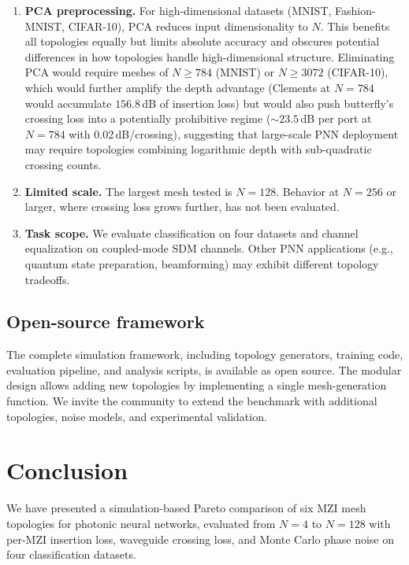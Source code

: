 \documentclass[11pt,a4paper]{article}
\begin{document}
\begin{enumerate}
  \item \textbf{PCA preprocessing.}  For high-dimensional datasets (MNIST,
        Fashion-MNIST, CIFAR-10), PCA reduces input dimensionality to $N$.
        This benefits all topologies equally but limits absolute accuracy and
        obscures potential differences in how topologies handle
        high-dimensional structure.  Eliminating PCA would require meshes of
        $N \geq 784$ (MNIST) or $N \geq 3072$ (CIFAR-10), which would further
        amplify the depth advantage (Clements at $N{=}784$ would accumulate
        $156.8$\,dB of insertion loss) but would also push butterfly's crossing
        loss into a potentially prohibitive regime (${\sim}23.5$\,dB per port at
        $N{=}784$ with 0.02\,dB/crossing), suggesting that large-scale PNN
        deployment may require topologies combining logarithmic depth with
        sub-quadratic crossing counts.

  \item \textbf{Limited scale.}  The largest mesh tested is $N{=}128$.
        Behavior at $N{=}256$ or larger, where crossing loss grows further,
        has not been evaluated.

  \item \textbf{Task scope.}  We evaluate classification on four datasets
        and channel equalization on coupled-mode SDM channels.  Other PNN
        applications (e.g., quantum state preparation, beamforming) may
        exhibit different topology tradeoffs.
\end{enumerate}

\subsection{Open-source framework}

The complete simulation framework, including topology generators, training code,
evaluation pipeline, and analysis scripts, is available as open source.  The
modular design allows adding new topologies by implementing a single mesh-generation
function.  We invite the community to extend the benchmark with additional
topologies, noise models, and experimental validation.


\section{Conclusion}
\label{sec:conclusion}

We have presented a simulation-based Pareto comparison of six MZI mesh topologies
for photonic neural networks, evaluated from $N{=}4$ to $N{=}128$ with per-MZI
insertion loss, waveguide crossing loss, and Monte Carlo phase noise on four
classification datasets.
\end{document}
